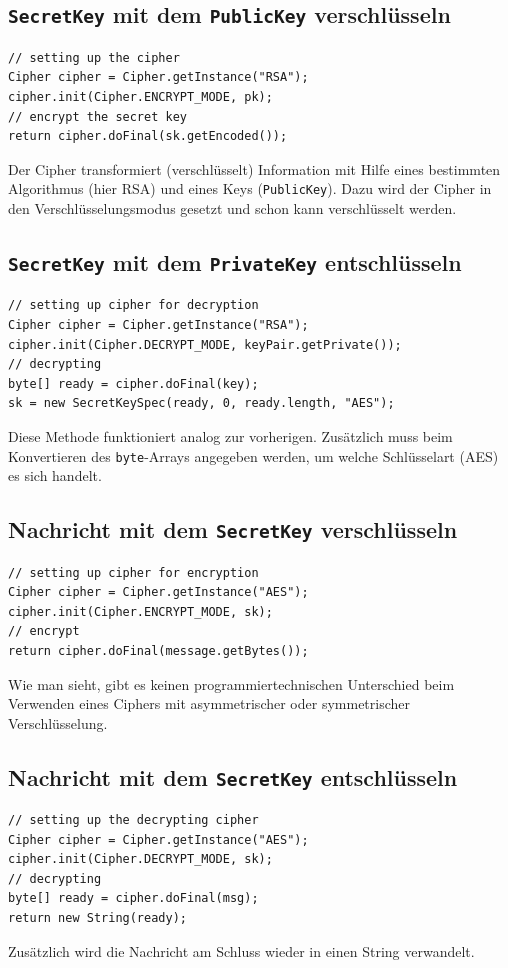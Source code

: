 \subsection{\texttt{SecretKey} mit dem \texttt{PublicKey} verschlüsseln}
\begin{lstlisting}[style=Java, caption=\texttt{SecretKey} mit dem \texttt{PublicKey} verschlüsseln]
// setting up the cipher
Cipher cipher = Cipher.getInstance("RSA");
cipher.init(Cipher.ENCRYPT_MODE, pk);
// encrypt the secret key
return cipher.doFinal(sk.getEncoded());
\end{lstlisting}
Der Cipher transformiert (verschlüsselt) Information mit Hilfe eines bestimmten Algorithmus (hier RSA) und eines Keys (\texttt{PublicKey}). Dazu wird der Cipher in den Verschlüsselungsmodus gesetzt und schon kann verschlüsselt werden.
\clearpage
\subsection{\texttt{SecretKey} mit dem \texttt{PrivateKey} entschlüsseln}
\begin{lstlisting}[style=Java, caption=\texttt{SecretKey} mit dem \texttt{PrivateKey} entschlüsseln]
// setting up cipher for decryption
Cipher cipher = Cipher.getInstance("RSA");
cipher.init(Cipher.DECRYPT_MODE, keyPair.getPrivate());
// decrypting
byte[] ready = cipher.doFinal(key);
sk = new SecretKeySpec(ready, 0, ready.length, "AES");
\end{lstlisting}
Diese Methode funktioniert analog zur vorherigen. Zusätzlich muss beim Konvertieren des \texttt{byte}-Arrays angegeben werden, um welche Schlüsselart (AES) es sich handelt.
\subsection{Nachricht mit dem \texttt{SecretKey} verschlüsseln}
\begin{lstlisting}[style=Java, caption=symmetrische Verschlüsselung]
// setting up cipher for encryption
Cipher cipher = Cipher.getInstance("AES");
cipher.init(Cipher.ENCRYPT_MODE, sk);
// encrypt
return cipher.doFinal(message.getBytes());
\end{lstlisting}
Wie man sieht, gibt es keinen programmiertechnischen Unterschied beim Verwenden eines Ciphers mit asymmetrischer oder symmetrischer Verschlüsselung.
\subsection{Nachricht mit dem \texttt{SecretKey} entschlüsseln}
\begin{lstlisting}[style=Java, caption=symmetrische Entschlüsselung]
// setting up the decrypting cipher
Cipher cipher = Cipher.getInstance("AES");
cipher.init(Cipher.DECRYPT_MODE, sk);
// decrypting
byte[] ready = cipher.doFinal(msg);
return new String(ready);
\end{lstlisting}
Zusätzlich wird die Nachricht am Schluss wieder in einen String verwandelt.
\clearpage
